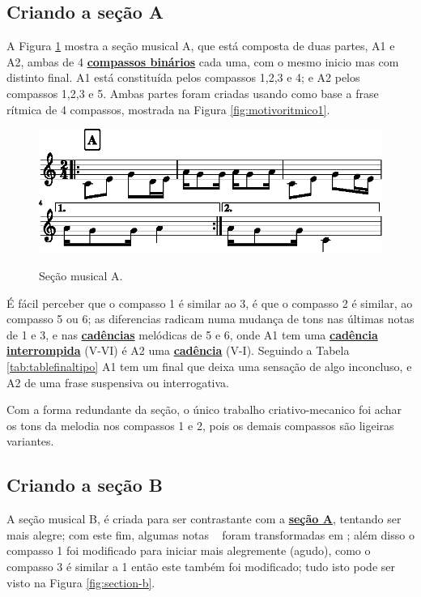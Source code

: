 \subsection{Criando a seção A}
\label{subsec:criandoa}
A Figura \ref{fig:section-a} mostra a seção musical A, 
que está composta de duas partes, A1 e A2, 
ambas de 4 \hyperref[subsec:compassobinario]{\textbf{compassos binários}} cada uma, com o mesmo inicio mas com distinto final.
A1 está constituída pelos compassos 1,2,3 e 4; e A2 pelos compassos 1,2,3 e 5.
Ambas partes foram criadas usando como base a frase rítmica de 4 compassos, mostrada na Figura \ref{fig:motivoritmico1}.
     \begin{figure}[H]
	     \centering
	     \href{https://drive.google.com/file/d/1LS2rPtHilL0lv_URBl_Tzs0jZcrSPwgk/view?usp=sharing}{\includegraphics[width=\textwidth]{chapters/cap-musica-topicos/section-a-1.eps}}
	     \caption{Seção musical A.}
	     \label{fig:section-a}
     \end{figure}
É fácil perceber que o compasso 1 é similar ao 3, é que o compasso 2 é similar, ao compasso 5 ou 6; 
as diferencias radicam numa mudança de tons nas últimas notas de 1 e 3, e nas \hyperref[subsec:cadenciamelodica]{\textbf{cadências}} melódicas de 5 e 6, 
onde A1 tem uma \hyperref[subsec:cadenciamelodica]{\textbf{cadência interrompida}} (V-VI) é A2 uma \hyperref[subsec:cadenciamelodica]{\textbf{cadência}} (V-I). 
Seguindo a Tabela \ref{tab:tablefinaltipo} A1 tem um final que deixa uma sensação de algo inconcluso,
e A2 de uma frase suspensiva ou interrogativa.

Com a forma redundante da seção, o único trabalho criativo-mecanico foi achar os tons da melodia nos compassos 1 e 2,
pois os demais compassos são ligeiras variantes.


\subsection{Criando a seção B}
\label{subsec:criandob}
A seção musical B, é criada para ser contrastante com a \hyperref[subsec:criandoa]{\textbf{seção A}},
tentando ser mais alegre;
com este fim, algumas notas \Acht~ foram transformadas em \Sech \Sech;
além disso o compasso 1 foi modificado para iniciar mais alegremente (agudo),
como o compasso 3 é similar a 1 então este também foi modificado;
tudo isto pode ser visto na  Figura \ref{fig:section-b}.

